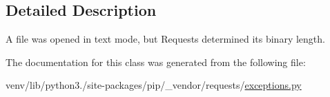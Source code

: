 \subsection{Detailed Description}
\begin{DoxyVerb}A file was opened in text mode, but Requests determined its binary length.\end{DoxyVerb}
 

The documentation for this class was generated from the following file\+:\begin{DoxyCompactItemize}
\item 
venv/lib/python3./site-\/packages/pip/\+\_\+vendor/requests/\hyperlink{pip_2__vendor_2requests_2exceptions_8py}{exceptions.\+py}\end{DoxyCompactItemize}
